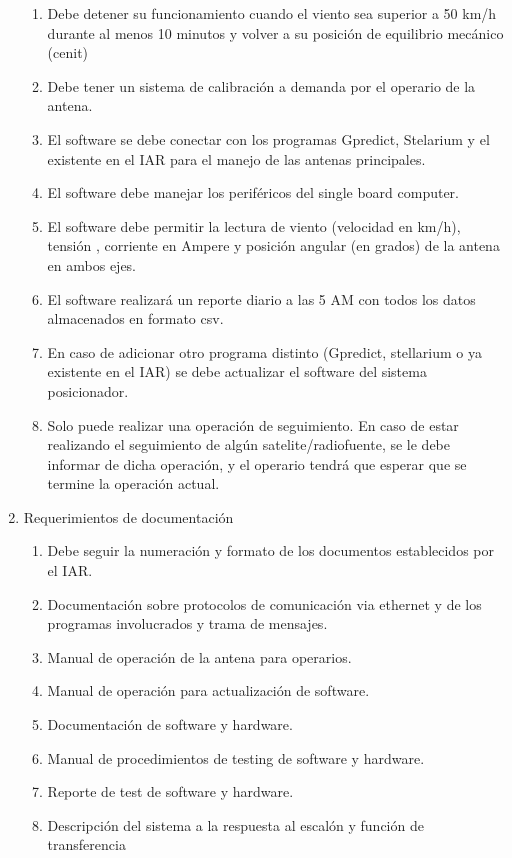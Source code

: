 \documentclass[11pt, %
codirector, %
]{charter}
\begin{document}
\begin{enumerate}
\begin{enumerate}
			\item Debe detener su funcionamiento cuando el viento sea superior a 50 km/h durante al menos 10 minutos y volver a su posición de equilibrio mecánico (cenit) 
			\item Debe tener un sistema de calibración a demanda por el operario de la antena. 
			\item El software se debe conectar con los programas Gpredict, Stelarium y el existente en el IAR para el manejo de las antenas principales. 
			\item El software debe manejar los periféricos del single board computer. 
			\item El software debe permitir la lectura de viento (velocidad en km/h), tensión , corriente en Ampere y posición angular (en grados) de la antena en ambos ejes. 
			\item El software realizará un reporte diario a las 5 AM con todos los datos almacenados en formato csv.  
			\item En caso de adicionar otro programa distinto (Gpredict, stellarium o ya existente en el IAR) se debe actualizar el software del sistema posicionador. 
			\item Solo puede realizar una operación de seguimiento. En caso de estar realizando el seguimiento de algún satelite/radiofuente, se le debe informar de dicha operación, y el operario tendrá que esperar que se termine la operación actual.  
		\end{enumerate}
	\item Requerimientos de documentación
		\begin{enumerate}
			\item Debe seguir la numeración y formato de los documentos establecidos por el IAR. 
			\item Documentación sobre protocolos de comunicación via ethernet y de los programas involucrados y trama de mensajes.
			\item Manual de operación de la antena para operarios. 
			\item Manual de operación para actualización de software. 
			\item Documentación de software y hardware. 
			\item Manual de procedimientos de testing de software y hardware.	
			\item Reporte de test de software y hardware. 
			\item Descripción del sistema a la respuesta al escalón y función de transferencia
	\end{enumerate}

\end{enumerate}
\end{document}
